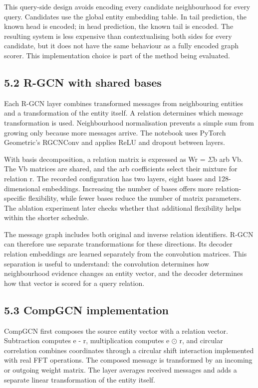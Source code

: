 \documentclass[11pt]{article}
\begin{document}
This query-side design avoids encoding every candidate neighbourhood for every query. Candidates use the global entity embedding table. In tail prediction, the known head is encoded; in head prediction, the known tail is encoded. The resulting system is less expensive than contextualising both sides for every candidate, but it does not have the same behaviour as a fully encoded graph scorer. This implementation choice is part of the method being evaluated.

\subsection*{5.2 R-GCN with shared bases}
Each R-GCN layer combines transformed messages from neighbouring entities and a transformation of the entity itself. A relation determines which message transformation is used. Neighbourhood normalisation prevents a simple sum from growing only because more messages arrive. The notebook uses PyTorch Geometric's RGCNConv and applies ReLU and dropout between layers.

With basis decomposition, a relation matrix is expressed as Wr = $\Sigma$b arb Vb. The Vb matrices are shared, and the arb coefficients select their mixture for relation r. The recorded configuration has two layers, eight bases and 128-dimensional embeddings. Increasing the number of bases offers more relation-specific flexibility, while fewer bases reduce the number of matrix parameters. The ablation experiment later checks whether that additional flexibility helps within the shorter schedule.

The message graph includes both original and inverse relation identifiers. R-GCN can therefore use separate transformations for these directions. Its decoder relation embeddings are learned separately from the convolution matrices. This separation is useful to understand: the convolution determines how neighbourhood evidence changes an entity vector, and the decoder determines how that vector is scored for a query relation.

\subsection*{5.3 CompGCN implementation}
CompGCN first composes the source entity vector with a relation vector. Subtraction computes e - r, multiplication computes e $\odot$ r, and circular correlation combines coordinates through a circular shift interaction implemented with real FFT operations. The composed message is transformed by an incoming or outgoing weight matrix. The layer averages received messages and adds a separate linear transformation of the entity itself.
\end{document}
